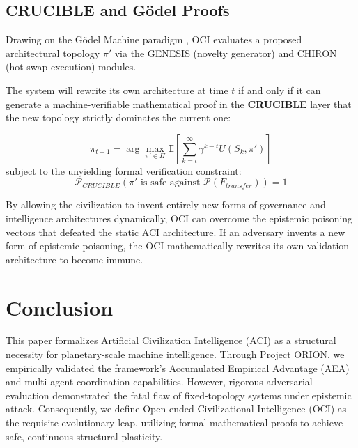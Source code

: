 \documentclass[12pt,a4paper]{article}
\begin{document}
\subsection{CRUCIBLE and G\"odel Proofs}
Drawing on the G\"odel Machine paradigm \cite{schmidhuber2006godel}, OCI evaluates a proposed architectural topology $\pi'$ via the GENESIS (novelty generator) and CHIRON (hot-swap execution) modules. 

The system will rewrite its own architecture at time $t$ if and only if it can generate a machine-verifiable mathematical proof in the \textbf{CRUCIBLE} layer that the new topology strictly dominates the current one:

\begin{equation}
    \pi_{t+1} = \arg\max_{\pi' \in \Pi} \mathbb{E}\left[ \sum_{k=t}^{\infty} \gamma^{k-t} U(S_k, \pi') \right] 
\end{equation}
subject to the unyielding formal verification constraint:
\begin{equation}
    \mathcal{P}_{CRUCIBLE}(\pi' \text{ is safe against } \mathcal{P}(F_{transfer})) = 1
\end{equation}

By allowing the civilization to invent entirely new forms of governance and intelligence architectures dynamically, OCI can overcome the epistemic poisoning vectors that defeated the static ACI architecture. If an adversary invents a new form of epistemic poisoning, the OCI mathematically rewrites its own validation architecture to become immune.

\section{Conclusion}
This paper formalizes Artificial Civilization Intelligence (ACI) as a structural necessity for planetary-scale machine intelligence. Through Project ORION, we empirically validated the framework's Accumulated Empirical Advantage (AEA) and multi-agent coordination capabilities. However, rigorous adversarial evaluation demonstrated the fatal flaw of fixed-topology systems under epistemic attack. Consequently, we define Open-ended Civilizational Intelligence (OCI) as the requisite evolutionary leap, utilizing formal mathematical proofs to achieve safe, continuous structural plasticity.
\end{document}
